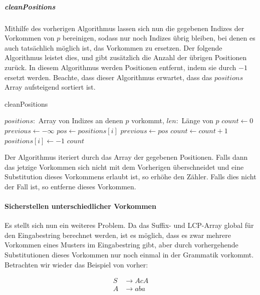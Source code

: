 \subparagraph{cleanPositions}

Mithilfe des vorherigen Algorithmus lassen sich nun die gegebenen Indizes der Vorkommen von $p$ bereinigen, sodass nur noch Indizes übrig bleiben, bei denen es auch tatsächlich möglich ist, das Vorkommen zu ersetzen. Der folgende Algorithmus leistet dies, und gibt zusätzlich die Anzahl der übrigen Positionen zurück. In diesem Algorithmus werden Positionen entfernt, indem sie durch $-1$ ersetzt werden. Beachte, dass dieser Algorithmus erwartet, dass das $positions$ Array aufsteigend sortiert ist.

\begin{algorithm}
    \begin{algorithmic}
        \caption{cleanPositions}
        \REQUIRE $positions: $ Array von Indizes an denen $p$ vorkommt, $len: $ Länge von $p$
        \STATE $count \leftarrow 0$
        \STATE $previous \leftarrow -\infty$
            \STATE $pos \leftarrow positions[i]$
                \STATE $previous \leftarrow pos$
                \STATE $count \leftarrow count + 1$
            \ELSE
                \STATE $positions[i] \leftarrow -1$
            \ENDIF
        \ENDFOR
        \RETURN $count$
    \end{algorithmic}
\end{algorithm}

Der Algorithmus iteriert durch das Array der gegebenen Positionen. Falls dann das jetzige Vorkommen sich nicht mit dem Vorherigen überschneidet und eine Substitution dieses Vorkommens erlaubt ist, so erhöhe den Zähler. Falls dies nicht der Fall ist, so entferne dieses Vorkommen.

\paragraph{Sicherstellen unterschiedlicher Vorkommen}

Es stellt sich nun ein weiteres Problem. Da das Suffix- und LCP-Array global für den Eingabestring berechnet werden, ist es möglich, dass es zwar mehrere Vorkommen eines Musters im Eingabestring gibt, aber durch vorhergehende Substitutionen dieses Vorkommen nur noch einmal in der Grammatik vorkommt. Betrachten wir wieder das Beispiel von vorher:

\begin{align*}
    S &\rightarrow AcA\\
    A &\rightarrow aba
\end{align*}

